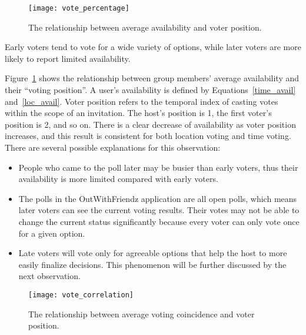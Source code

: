 \begin{figure}
\centering
\texttt{[image: vote\_percentage]}
\caption{The relationship between average availability and voter position.}
\label{fig:votepercentage}
\end{figure}

\begin{observation}
Early voters tend to vote for a wide variety of options, while later voters are
more likely to report limited availability.
\end{observation}

Figure~\ref{fig:votepercentage} shows the relationship between group members'
average availability and their ``voting position''. A user's availability is
defined by Equations~\ref{time_avail} and~\ref{loc_avail}. Voter position refers
to the temporal index of casting votes within the scope of an invitation.
The host's position is 1, the first voter's position is 2, and so on.
There is a clear decrease of availability as voter position increases, and
this result is consistent for both location voting and time voting. There are
several possible explanations for this observation:

\begin{itemize}
\item People who came to the poll later may be busier than early voters, 
thus their availability is more limited compared with early voters.
\item The polls in the OutWithFriendz application are all open polls, which
means later voters can see the current voting results. Their votes may
not be able to change the current status significantly because every voter can
only vote once for a given option.
\item Late voters will vote only for agreeable options that help the host to
more easily finalize decisions. This phenomenon will be further discussed by the
next observation.
\end{itemize}

\begin{figure}
\centering
\texttt{[image: vote\_correlation]}
\caption{The relationship between average voting coincidence and voter position.}
\label{fig:votecoin}
\end{figure}

